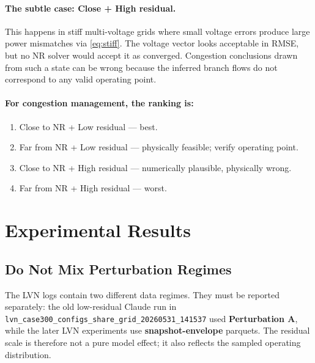 \documentclass{article}
\begin{document}
\paragraph{The subtle case: Close + High residual.}
This happens in stiff multi-voltage grids where small voltage errors produce
large power mismatches via \eqref{eq:stiff}.  The voltage vector looks
acceptable in RMSE, but no NR solver would accept it as converged.
Congestion conclusions drawn from such a state can be wrong because the
inferred branch flows do not correspond to any valid operating point.

\paragraph{For congestion management, the ranking is:}
\begin{enumerate}[noitemsep]
  \item Close to NR + Low residual --- best.
  \item Far from NR + Low residual --- physically feasible; verify operating point.
  \item Close to NR + High residual --- numerically plausible, physically wrong.
  \item Far from NR + High residual --- worst.
\end{enumerate}

\section{Experimental Results}

\subsection{Do Not Mix Perturbation Regimes}

The LVN logs contain two different data regimes.  They must be reported
separately: the old low-residual Claude run in
\texttt{lvn\_case300\_configs\_share\_grid\_20260531\_141537} used
\textbf{Perturbation A}, while the later LVN experiments use
\textbf{snapshot-envelope} parquets.  The residual scale is therefore not a
pure model effect; it also reflects the sampled operating distribution.
\end{document}
